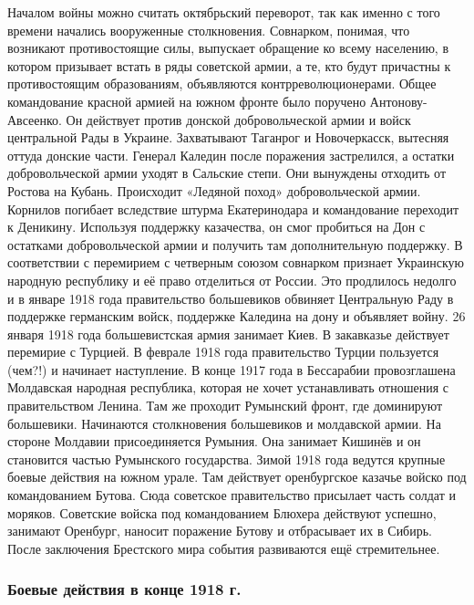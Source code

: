 Началом войны можно считать октябрьский переворот, так как именно с того времени начались вооруженные столкновения. Совнарком, понимая, что возникают противостоящие силы, выпускает обращение ко всему населению, в котором призывает встать в ряды советской армии, а те, кто будут причастны к противостоящим образованиям, объявляются контрреволюционерами.
Общее командование красной армией на южном фронте было поручено Антонову-Авсеенко. Он действует против донской добровольческой армии и войск центральной Рады в Украине. Захватывают Таганрог и Новочеркасск, вытесняя оттуда донские части. Генерал Каледин после поражения застрелился, а остатки добровольческой армии уходят в Сальские степи. Они вынуждены отходить от Ростова на Кубань. Происходит «Ледяной поход» добровольческой армии. Корнилов погибает вследствие штурма Екатеринодара и командование переходит к Деникину. Используя поддержку казачества, он смог пробиться на Дон с остатками добровольческой армии и получить там дополнительную поддержку. 
В соответствии с перемирием с четверным союзом совнарком признает Украинскую народную республику и её право отделиться от России. Это продлилось недолго и в январе 1918 года правительство большевиков обвиняет Центральную Раду в поддержке германским войск, поддержке Каледина на дону и объявляет войну. 26 января 1918 года большевистская армия занимает Киев.
В закавказье действует перемирие с Турцией. В феврале 1918 года правительство Турции пользуется (чем?!) и начинает наступление.
В конце 1917 года в Бессарабии провозглашена Молдавская народная республика, которая не хочет устанавливать отношения с правительством Ленина. Там же проходит Румынский фронт, где доминируют большевики. Начинаются столкновения большевиков и молдавской армии. На стороне Молдавии присоединяется Румыния. Она занимает Кишинёв и он становится частью Румынского государства.
Зимой 1918 года ведутся крупные боевые действия на южном урале. Там действует оренбургское казачье войско под командованием Бутова. Сюда советское правительство присылает часть солдат и моряков. Советские войска под командованием Блюхера действуют успешно, занимают Оренбург, наносит поражение Бутову и отбрасывает их в Сибирь.
После заключения Брестского мира события развиваются ещё стремительнее.

\subsubsection{Боевые действия в конце 1918 г.}

